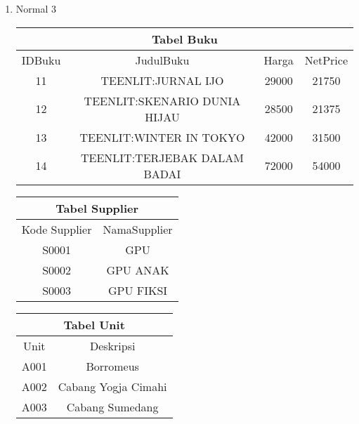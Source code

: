 \documentclass[12pt,a4paper]{article}
\begin{document}
\begin{enumerate}
\begin{enumerate}
          \item Normal 3

            \begin{adjustbox}{scale=0.6,center}
              \begin{tabular}{ |c|c|c|c| } 
                \hline \multicolumn{4}{|c|}{Tabel Buku} \\ \hline \hline
                IDBuku & JudulBuku                    & Harga & NetPrice \\ \hline
                11     & TEENLIT:JURNAL IJO           & 29000 & 21750    \\ \hline
                12     & TEENLIT:SKENARIO DUNIA HIJAU & 28500 & 21375    \\ \hline
                13     & TEENLIT:WINTER IN TOKYO      & 42000 & 31500    \\ \hline
                14     & TEENLIT:TERJEBAK DALAM BADAI & 72000 & 54000    \\ \hline
              \end{tabular}
            \end{adjustbox}

            \begin{multicols}{3}

              \begin{adjustbox}{scale=0.6,center}
                \begin{tabular}{ |c|c| } 
                  \hline \multicolumn{2}{|c|}{Tabel Supplier} \\ \hline \hline
                  Kode Supplier & NamaSupplier   \\ \hline \hline
                  S0001         & GPU            \\ \hline
                  S0002         & GPU ANAK       \\ \hline
                  S0003         & GPU FIKSI      \\ \hline
                \end{tabular}
              \end{adjustbox}


              \begin{adjustbox}{scale=0.6,center}
                \begin{tabular}{ |c|c| } 
                  \hline \multicolumn{2}{|c|}{Tabel Unit} \\ \hline \hline
                  Unit & Deskripsi           \\ \hline
                  A001 & Borromeus           \\ \hline
                  A002 & Cabang Yogja Cimahi \\ \hline
                  A003 & Cabang Sumedang     \\ \hline
                \end{tabular}
              \end{adjustbox}


\end{multicols}
\end{enumerate}
\end{enumerate}
\end{document}
